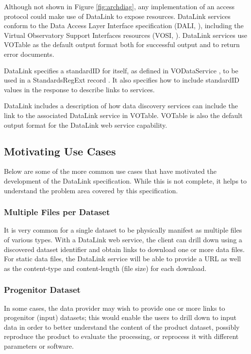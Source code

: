 \documentclass[11pt,a4paper]{ivoa}
\begin{document}
Although not shown in Figure \ref{fig:archdiag},
any implementation of an access protocol could
make use of DataLink to expose resources. DataLink services conform to
the Data Access Layer Interface specification
(DALI, \citet{2013ivoa.spec.1129D}),
including the
Virtual Observatory Support Interfaces resources
(VOSI, \citet{2011ivoa.spec.0531G}).
DataLink services use VOTable \citep{2013ivoa.spec.0920O}
as the default output format both for successful
output and to return error documents.

DataLink specifies a standardID for itself, as defined in VODataService
\citep{2010ivoa.spec.1202P},
to be used in a StandardsRegExt record \citep{2012ivoa.spec.0508H}.
It also specifies how to
include standardID values in the response to describe links to services.

DataLink includes a description of how data discovery services can include
the link to the associated DataLink service in VOTable. VOTable is
also the default output format for the DataLink web service capability.


\subsection{Motivating Use Cases}

Below are some of the more common use cases that have motivated the
development of the DataLink specification. While this is not complete,
it helps to understand the problem area covered by this specification.


\subsubsection{Multiple Files per Dataset}
\label{sec:useMultiFile}

It is very common for a single dataset to be physically manifest as
multiple files of various types. With a DataLink web service, the client
can drill down using a discovered dataset identifier and obtain links to
download one or more data files.  For static data files, the DataLink
service will be able to provide a URL as well as the content-type and
content-length (file size) for each download.


\subsubsection{Progenitor Dataset}

In some cases, the data provider may wish to provide one or more links to
progenitor (input) datasets; this would enable the users to drill down
to input data in order to better understand the content of the product
dataset, possibly reproduce the product to evaluate the processing,
or reprocess it with different parameters or software.
\end{document}
